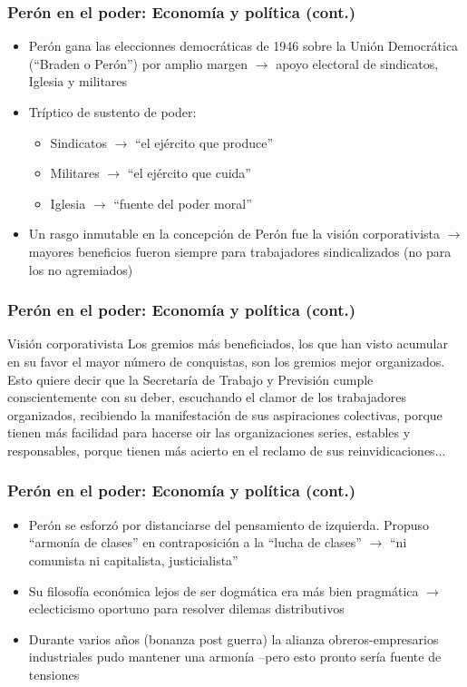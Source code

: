 \documentclass[14pt,aspectratio=169]{beamer}
\begin{document}
  \begin{frame}\frametitle{Perón en el poder: Economía y política (cont.)}
   \begin{itemize} \itemsep 10pt
   \item Perón gana las eleccionnes democráticas de 1946 sobre la
     Unión Democrática (``Braden o Perón'') por amplio margen
     $\longrightarrow$ apoyo electoral de sindicatos, Iglesia y
     militares
   \item Tríptico de sustento de poder:
     \begin{itemize}\itemsep 10pt \medskip
     \item Sindicatos $\longrightarrow$ ``el ejército que produce''
     \item Militares $\longrightarrow$ ``el ejército que cuida''
       \item Iglesia $\longrightarrow$ ``fuente del poder moral''
       \end{itemize}
        \item Un rasgo inmutable en la concepción de Perón fue la
          visión corporativista $\longrightarrow$ mayores beneficios
          fueron siempre para trabajadores sindicalizados (no para los
          no agremiados)
   \end{itemize}
 \end{frame}


  \begin{frame}\frametitle{Perón en el poder: Economía y política (cont.)}
    \begin{block}{Visión corporativista}
      Los gremios más beneficiados, los que han visto acumular en su
      favor el mayor número de conquistas, son los gremios mejor
      organizados. Esto quiere decir que la Secretaría de Trabajo y
      Previsión cumple conscientemente con su deber, escuchando el
      clamor de los trabajadores organizados, recibiendo la
      manifestación de sus aspiraciones colectivas, porque tienen más
      facilidad para hacerse oir las organizaciones series, estables y
      responsables, porque tienen más acierto en el reclamo de sus reinvidicaciones...
      \end{block}
 \end{frame}



  \begin{frame}\frametitle{Perón en el poder: Economía y política (cont.)}
   \begin{itemize} \itemsep 10pt
   \item Perón se esforzó por distanciarse del pensamiento de
     izquierda. Propuso ``armonía de clases'' en contraposición a la
     ``lucha de clases'' $\longrightarrow$ ``ni comunista ni
     capitalista, justicialista''
     \item Su filosofía económica lejos de ser dogmática era más bien
       pragmática $\longrightarrow$ eclecticismo oportuno para
       resolver dilemas distributivos 
\item Durante varios años (bonanza post guerra) la alianza obreros-empresarios industriales
  pudo mantener una armonía --pero esto pronto sería fuente de tensiones
     \end{itemize}
 \end{frame}
\end{document}
